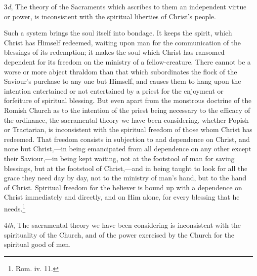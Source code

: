 \documentclass[]{book}
\begin{document}
3\emph{d}, The theory of the Sacraments which ascribes to them an independent virtue or power, is inconsistent with the spiritual liberties of Christ's people.

Such a system brings the soul itself into bondage. It keeps the spirit, which Christ has Himself redeemed, waiting upon man for the communication of the blessings of its redemption; it makes the soul which Christ has ransomed dependent for its freedom on the ministry of a fellow-creature. There cannot be a worse or more abject thraldom than that which subordinates the flock of the Saviour's purchase to any one but Himself, and causes them to hang upon the intention entertained or not entertained by a priest for the enjoyment or forfeiture of spiritual blessing. But even apart from the monstrous doctrine of the Romish Church as to the intention of the priest being necessary to the efficacy of the ordinance, the sacramental theory we have been considering, whether Popish or Tractarian, is inconsistent with the spiritual freedom of those whom Christ has redeemed. That freedom consists in subjection to and dependence on Christ, and none but Christ,---in being emancipated from all dependence on any other except their Saviour,---in being kept waiting, not at the footstool of man for saving blessings, but at the footstool of Christ,---and in being taught to look for all the grace they need day by day, not to the ministry of man's hand, but to the hand of Christ. Spiritual freedom for the believer is bound up with a dependence on Christ immediately and directly, and on Him alone, for every blessing that he needs.\footnote{Rom. iv. 11.}

4\emph{th}, The sacramental theory we have been considering is inconsistent with the spirituality of the Church, and of the power exercised by the Church for the spiritual good of men.
\end{document}
